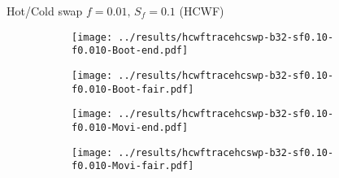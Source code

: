 \documentclass[10pt,a4paper]{beamer}
\begin{document}
\begin{frame}{Hot/Cold swap $f=0.01,\, S_f=0.1$ (HCWF)}
	\begin{figure}
		\begin{subfigure}{.48\textwidth}
			\centering
			\texttt{[image: ../results/hcwftracehcswp-b32-sf0.10-f0.010-Boot-end.pdf]}
		\end{subfigure}
		\begin{subfigure}{.48\textwidth}
			\centering
			\texttt{[image: ../results/hcwftracehcswp-b32-sf0.10-f0.010-Boot-fair.pdf]}
		\end{subfigure}
	\end{figure}

	\begin{figure}
		\begin{subfigure}{.48\textwidth}
			\centering
			\texttt{[image: ../results/hcwftracehcswp-b32-sf0.10-f0.010-Movi-end.pdf]}
		\end{subfigure}
		\begin{subfigure}{.48\textwidth}
			\centering
			\texttt{[image: ../results/hcwftracehcswp-b32-sf0.10-f0.010-Movi-fair.pdf]}
		\end{subfigure}
	\end{figure}
\end{frame}
\end{document}
